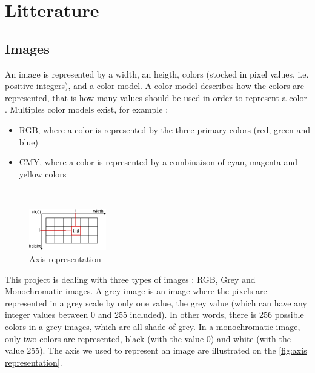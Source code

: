\chapter{Litterature}


\section{Images}

An image is represented by a width, an heigth, colors (stocked in pixel values, i.e. positive integers), and a color model. A color model describes how the colors are represented, that is how many values should be used in order to represent a color \cite{bib:image:ColorModel}. Multiples color models exist, for example : 
\begin{itemize}
	\item RGB, where a color is represented by the three primary colors (red, green and blue)
	\item CMY, where a color is represented by a combinaison of cyan, magenta and yellow colors
\end{itemize}


~~

\begin{figure}
	\centering
	\includegraphics[width=0.3\textwidth]{images/axis/axis_representation}
	\caption{Axis representation}
	\label{fig:axis representation}
\end{figure}


This project is dealing with three types of images : RGB, Grey and Monochromatic images. A grey image is an image where the pixels are represented in a grey scale by only one value, the grey value (which can have any integer values between 0 and 255 included). In other words, there is 256 possible colors in a grey images, which are all shade of grey. In a monochromatic image, only two colors are represented, black (with the value 0) and white (with the value 255). The axis we used to represent an image are illustrated on the \vref{fig:axis representation}. 


